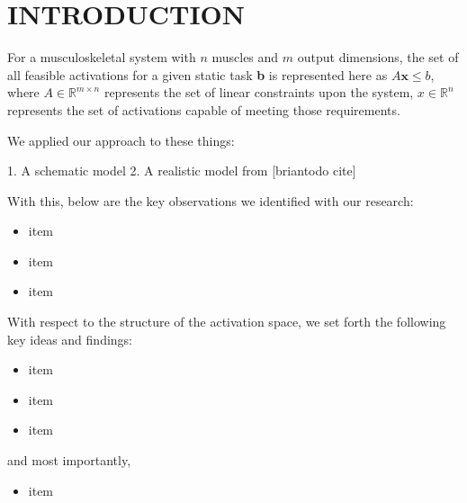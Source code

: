 
\section{INTRODUCTION}

For a musculoskeletal system with $n$ muscles and $m$ output dimensions, the set of all feasible activations for a given static task \textbf{b} is represented here as
$A\textbf{x} \leq b$, where $A \in \mathbb{R}^{m \times n}$ represents the set of linear constraints upon the system, $x \in \mathbb{R}^n$ represents the set of activations capable of meeting those requirements.


We applied our approach to these things:

1. A schematic model
2. A realistic model from [briantodo cite]

With this, below are the key observations we identified with our research:
\begin{itemize}
\item{item}
\item{item}
\item{item}
\end{itemize}

With respect to the structure of the activation space, we set forth the following key ideas and findings:
\begin{itemize}
\item{item}
\item{item}
\item{item}
\end{itemize}
and most importantly,
\begin{itemize}
\item{item}
\end{itemize}
